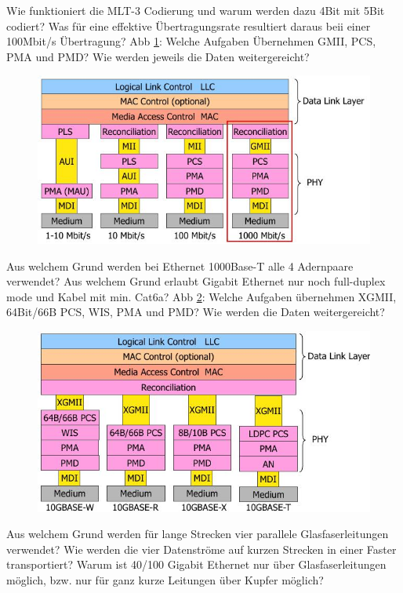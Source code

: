 \documentclass[ngerman,a4paper,12pt]{scrreprt}
\begin{document}
\olR
	\li Wie funktioniert die MLT-3 Codierung und warum werden dazu 4Bit mit 5Bit codiert? Was für eine effektive Übertragungsrate resultiert daraus beii einer 100Mbit/s Übertragung?
	\li Abb \ref{fasteth}: Welche Aufgaben Übernehmen GMII, PCS, PMA und PMD? Wie werden jeweils die Daten weitergereicht?
	 	\begin{figure}[H]
			\centering
			\caption{}
			\includegraphics[scale=0.40]{img/R1.5.jpg}
			\label{fasteth}
		\end{figure}			 
	\li Aus welchem Grund werden bei Ethernet 1000Base-T alle 4 Adernpaare verwendet?
\olS
{}
\olR
	\li Aus welchem Grund erlaubt Gigabit Ethernet nur noch full-duplex mode und Kabel mit min. Cat6a?
	\li Abb \ref{gigabeth}: Welche Aufgaben übernehmen XGMII, 64Bit/66B PCS, WIS, PMA und PMD? Wie werden die Daten weitergereicht? 	
		\begin{figure}[H]
			\centering
			\caption{}
			\includegraphics[scale=0.40]{img/R1.6.jpg}
			\label{gigabeth}
		\end{figure}			 
	\li Aus welchem Grund werden für lange Strecken vier parallele Glasfaserleitungen verwendet?
Wie werden die vier Datenströme auf kurzen Strecken in einer Faster transportiert?
\olS
{}
\olR
	\li Warum ist 40/100 Gigabit Ethernet nur über Glasfaserleitungen möglich, bzw. nur für ganz kurze Leitungen über Kupfer möglich?
\olS
\end{document}
